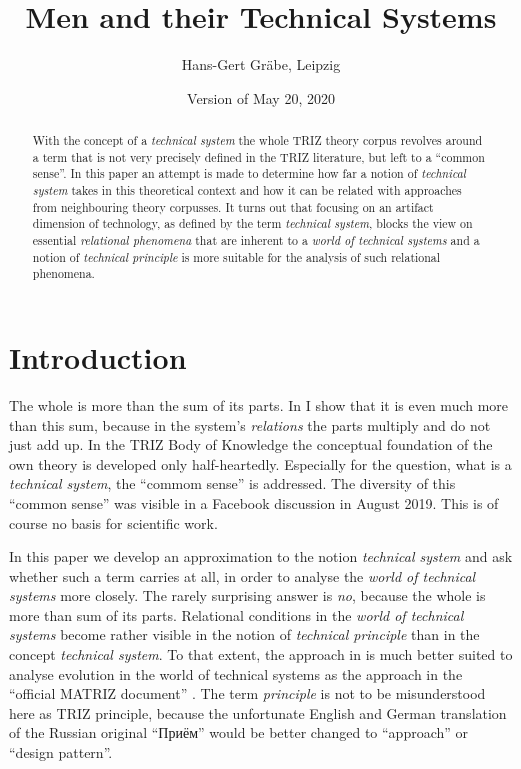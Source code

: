 \documentclass[11pt,a4paper]{article}
\title{Men and their Technical Systems}
\author{Hans-Gert Gräbe, Leipzig}
\date{Version of May 20, 2020}
\begin{document}
\maketitle

\begin{abstract}
  With the concept of a \emph{technical system} the whole TRIZ theory corpus
  revolves around a term that is not very precisely defined in the TRIZ
  literature, but left to a ``common sense''.  In this paper an attempt is
  made to determine how far a notion of \emph{technical system} takes in this
  theoretical context and how it can be related with approaches from
  neighbouring theory corpusses.  It turns out that focusing on an artifact
  dimension of technology, as defined by the term \emph{technical system},
  blocks the view on essential \emph{relational phenomena} that are inherent
  to a \emph{world of technical systems} and a notion of \emph{technical
    principle} is more suitable for the analysis of such relational phenomena.
\end{abstract}

\section{Introduction}

The whole is more than the sum of its parts. In \cite{Graebe2020a} I show that
it is even much more than this sum, because in the system's \emph{relations}
the parts multiply and do not just add up.  In the TRIZ Body of Knowledge
\cite{TBK-2007} the conceptual foundation of the own theory is developed only
half-heartedly. Especially for the question, what is a \emph{technical
  system}, the ``commom sense'' is addressed. The diversity of this ``common
sense'' was visible in a Facebook discussion \cite{Graebe2019} in August
2019.  This is of course no basis for scientific work.

In this paper we develop an approximation to the notion \emph{technical
  system} and ask whether such a term carries at all, in order to analyse the
\emph{world of technical systems} more closely.  The rarely surprising answer
is \emph{no}, because the whole is more than sum of its parts.  Relational
conditions in the \emph{world of technical systems} become rather visible in
the notion of \emph{technical principle} than in the concept \emph{technical
  system}. To that extent, the approach in \cite{Shpakovsky2010} is much
better suited to analyse evolution in the world of technical systems as the
approach in the ``official MATRIZ document'' \cite{TESE2018}.  The term
\emph{principle} is not to be misunderstood here as TRIZ principle, because
the unfortunate English and German translation of the Russian original
\foreignlanguage{russian}{``Приём''} would be better changed to ``approach''
or ``design pattern''.
\end{document}
